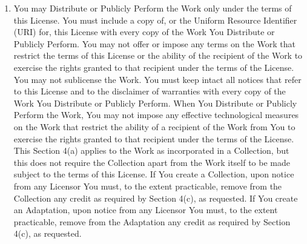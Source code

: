 \documentclass{article}
\begin{document}
{\begin{enumerate}
\begin{enumerate}
		\item You may Distribute or Publicly Perform the Work only under the terms of this License. You must include a copy of, or the Uniform Resource Identifier (URI) for, this License with every copy of the Work You Distribute or Publicly Perform. You may not offer or impose any terms on the Work that restrict the terms of this License or the ability of the recipient of the Work to exercise the rights granted to that recipient under the terms of the License. You may not sublicense the Work. You must keep intact all notices that refer to this License and to the disclaimer of warranties with every copy of the Work You Distribute or Publicly Perform. When You Distribute or Publicly Perform the Work, You may not impose any effective technological measures on the Work that restrict the ability of a recipient of the Work from You to exercise the rights granted to that recipient under the terms of the License. This Section 4(a) applies to the Work as incorporated in a Collection, but this does not require the Collection apart from the Work itself to be made subject to the terms of this License. If You create a Collection, upon notice from any Licensor You must, to the extent practicable, remove from the Collection any credit as required by Section 4(c), as requested. If You create an Adaptation, upon notice from any Licensor You must, to the extent practicable, remove from the Adaptation any credit as required by Section 4(c), as requested.

\end{enumerate}
\end{enumerate}}
\end{document}
